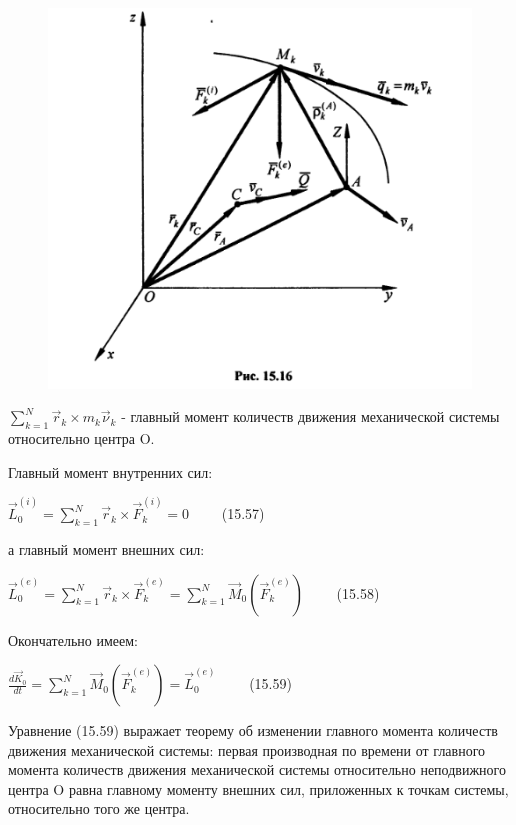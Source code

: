{\begin{center}
    \par \begin{figure}[H]
    \centering \includegraphics[scale = 0.5]{img/15.16.jpeg}
    \end{figure}
    
    \par $\sum\limits_{k=1}^N \vec{r}_{k}\times m_k \vec{\nu}_k$ - главный момент количеств движения  механической системы относительно центра O.

    \par Главный момент внутренних сил:

    \par $\vec{L}_0^{(i)}=\sum\limits_{k=1}^N \vec{r}_{k}\times \vec{F}_k^{(i)}=0 \qquad$ (15.57)

    \par а главный момент внешних сил:

    \par $\vec{L}_0^{(e)}=\sum\limits_{k=1}^N \vec{r}_{k}\times \vec{F}_k^{(e)}=\sum\limits_{k=1}^N \vec{M}_0(\vec{F}_k^{(e)}) \qquad$ (15.58)

    \par Окончательно имеем:

    \par $\frac{d\vec{K}_0}{dt}=\sum\limits_{k=1}^N \vec{M}_0(\vec{F}_k^{(e)})=\vec{L}_0^{(e)}\qquad$ (15.59)

    \par Уравнение (15.59) выражает теорему об изменении главного момента количеств движения механической системы: первая производная по времени от главного момента количеств движения механической системы относительно неподвижного центра O равна главному моменту внешних сил, приложенных к точкам системы, относительно того же центра.


\end{center}}
